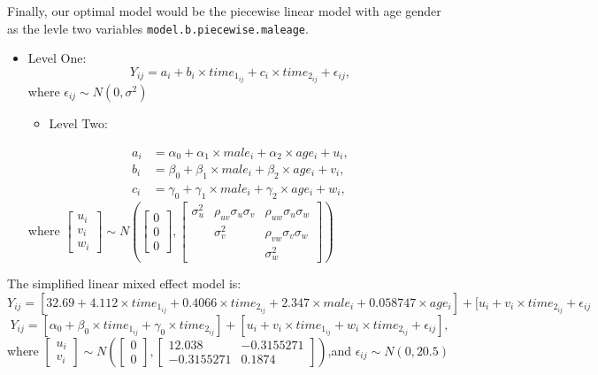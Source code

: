 \documentclass[
]{article}
\providecommand{\tightlist}{%
  \setlength{\itemsep}{0pt}\setlength{\parskip}{0pt}}
\begin{document}
Finally, our optimal model would be the piecewise linear model with age
gender as the levle two variables \texttt{model.b.piecewise.maleage}.

\begin{itemize}
\item
  Level One:
  \[Y_{ij} = a_i + b_i \times time_{1_{ij}} + c_i \times time_{2_{ij}} + \epsilon_{ij},\]
  where \(\epsilon_{ij} \sim N(0,\sigma^2)\)

  \begin{itemize}
  \tightlist
  \item
    Level Two:
  \end{itemize}

  \begin{align}
  a_i &= \alpha_0 + \alpha_1 \times male_i + \alpha_2 \times age_i + u_i, \\
  b_i &= \beta_0 + \beta_1 \times male_i + \beta_2 \times age_i + v_i, \\
  c_i &= \gamma_0 + \gamma_1 \times male_i + \gamma_2 \times age_i + w_i,
  \end{align} where
  \(\begin{bmatrix} u_i \\ v_i \\w_i \end{bmatrix} \sim N\left(\begin{bmatrix} 0 \\ 0 \\0 \end{bmatrix}, \begin{bmatrix}\sigma_{u}^2 & \rho_{uv}\sigma_u\sigma_v & \rho_{uw} \sigma_u \sigma_w \\ & \sigma_v^2 & \rho_{vw} \sigma_v\sigma_w \\ & & \sigma_w^2 \end{bmatrix}\right)\)
\end{itemize}

The simplified linear mixed effect model is:
\[Y_{ij} = [32.69 + 4.112\times time_{1_{ij}} +0.4066 \times time_{2_{ij}} + 2.347 \times male_i + 0.058747 \times age_i] + [u_i + v_i \times time_{2_{ij}} + \epsilon_{ij} \]
\[Y_{ij} = [\alpha_0 + \beta_0 \times time_{1_{ij}} + \gamma_0 \times time_{2_{ij}}] + [ u_i + v_i \times time_{1_{ij}} + w_i \times time_{2_{ij}} +  \epsilon_{ij} ],\]
where
\(\begin{bmatrix} u_i \\ v_i \end{bmatrix} \sim N\left(\begin{bmatrix} 0 \\ 0 \end{bmatrix}, \begin{bmatrix}12.038 & -0.3155271 \\ -0.3155271 & 0.1874\end{bmatrix}\right)\),and
\(\epsilon_{ij} \sim N(0,20.5)\)
\end{document}
